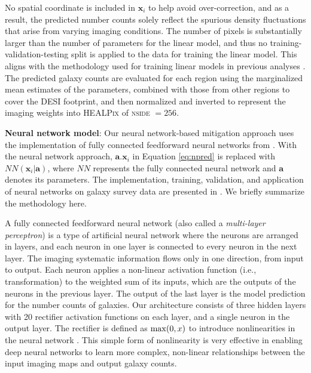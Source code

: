 No spatial coordinate is included in $\textbf{x}_{i}$ to help avoid over-correction, and as a result, the predicted number counts solely reflect the spurious density fluctuations that arise from varying imaging conditions. The number of pixels is substantially larger than the number of parameters for the linear model, and thus no training-validation-testing split is applied to the data for training the linear model. This aligns with the methodology used for training linear models in previous analyses \citep[see, e.g.,][]{zhou2022target}. The predicted galaxy counts are evaluated for each region using the marginalized mean estimates of the parameters, combined with those from other regions to cover the DESI footprint, and then normalized and inverted to represent the imaging weights into \textsc{HEALPix} of \textsc{nside} $=256$.


\textbf{Neural network model}: Our neural network-based mitigation approach uses the implementation of fully connected feedforward neural networks from \cite{rezaie2021primordial}. With the neural network approach, $\textbf{a}.\textbf{x}_{i}$ in Equation \ref{eq:npred} is replaced with $NN(\textbf{x}_{i}|\textbf{a})$, where $NN$ represents the fully connected neural network and $\textbf{a}$ denotes its parameters. The implementation, training, validation, and application of neural networks on galaxy survey data are presented in \cite{rezaie2021primordial}. We briefly summarize the methodology here. 

A fully connected feedforward neural network (also called a \textit{multi-layer perceptron}) is a type of artificial neural network where the neurons are arranged in layers, and each neuron in one layer is connected to every neuron in the next layer. The imaging systematic information flows only in one direction, from input to output. Each neuron applies a non-linear activation function (i.e., transformation) to the weighted sum of its inputs, which are the outputs of the neurons in the previous layer. The output of the last layer is the model prediction for the number counts of galaxies. Our architecture consists of three hidden layers with 20 rectifier activation functions on each layer, and a single neuron in the output layer. The rectifier is defined as ${\rm max}(0, x)$ to introduce nonlinearities in the neural network \citep{nair2010rectified}. This simple form of nonlinearity is very effective in enabling deep neural networks to learn more complex, non-linear relationships between the input imaging maps and output galaxy counts.

